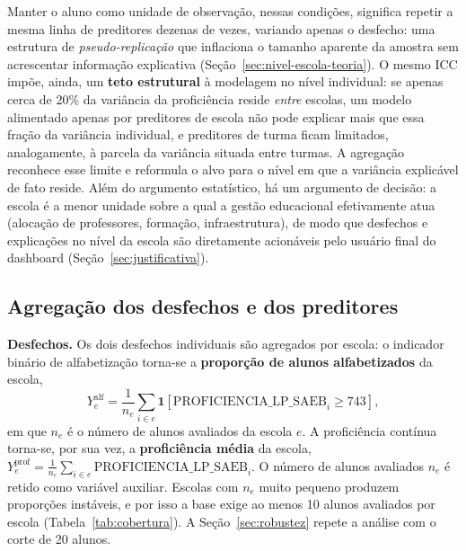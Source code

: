 Manter o aluno como unidade de observação, nessas condições, significa repetir
a mesma linha de preditores dezenas de vezes, variando apenas o desfecho:
uma estrutura de \emph{pseudo-replicação} que inflaciona o tamanho
aparente da amostra sem acrescentar informação explicativa
(Seção~\ref{sec:nivel-escola-teoria}). O mesmo ICC impõe, ainda, um
\textbf{teto estrutural} à modelagem no nível individual: se apenas cerca
de 20\% da variância da proficiência reside \emph{entre} escolas, um
modelo alimentado apenas por preditores de escola não pode explicar mais
que essa fração da variância individual, e preditores de turma ficam
limitados, analogamente, à parcela da variância situada entre turmas. A agregação reconhece esse limite e reformula o alvo para o
nível em que a variância explicável de fato reside. Além do argumento
estatístico, há um argumento de decisão: a escola é a menor unidade sobre a
qual a gestão educacional efetivamente atua (alocação de professores,
formação, infraestrutura), de modo que desfechos e explicações no nível da
escola são diretamente acionáveis pelo usuário final do
dashboard (Seção~\ref{sec:justificativa}).

\subsection{Agregação dos desfechos e dos preditores}
\label{sec:agregacao}

\textbf{Desfechos.} Os dois desfechos individuais são agregados por escola:
o indicador binário de alfabetização torna-se a \textbf{proporção de alunos
alfabetizados} da escola,
\begin{equation}
    Y_e^{\text{alf}} = \frac{1}{n_e} \sum_{i \in e} \mathbf{1}\left[\text{PROFICIENCIA\_LP\_SAEB}_i \geq 743\right],
    \label{eq:prop-alfabetizado}
\end{equation}
em que $n_e$ é o número de alunos avaliados da escola $e$. A proficiência
contínua torna-se, por sua vez, a \textbf{proficiência média} da escola,
$Y_e^{\text{prof}} = \frac{1}{n_e} \sum_{i \in e}
\text{PROFICIENCIA\_LP\_SAEB}_i$. O número de alunos avaliados $n_e$ é
retido como variável auxiliar. Escolas com $n_e$ muito pequeno produzem
proporções instáveis, e por isso a base exige ao menos 10 alunos avaliados
por escola (Tabela~\ref{tab:cobertura}). A Seção~\ref{sec:robustez} repete
a análise com o corte de 20 alunos.

